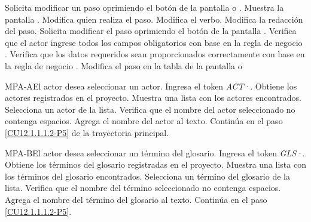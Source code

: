 	\begin{UCtrayectoria}
		\UCpaso[\UCactor] Solicita modificar un paso oprimiendo el botón \editar de la pantalla  o .
		\UCpaso[\UCsist] Muestra la pantalla .
		\UCpaso[\UCactor] Modifica quien realiza el paso. \label{CU12.1.1.1.2-P3}
		\UCpaso[\UCactor] Modifica el verbo.
		\UCpaso[\UCactor] Modifica la redacción del paso.            \label{CU12.1.1.1.2-P5}
		\UCpaso[\UCactor] Solicita modificar el paso oprimiendo el botón  de la pantalla .  
		\UCpaso[\UCsist] Verifica que el actor ingrese todos los campos obligatorios con base en la regla de negocio . 
		\UCpaso[\UCsist] Verifica que los datos requeridos sean proporcionados correctamente con base en la regla de negocio . 
		\UCpaso[\UCsist] Modifica el paso en la tabla de la pantalla  o 
	\end{UCtrayectoria}		
	
	\begin{UCtrayectoriaA}{MPA-A}{El actor desea seleccionar un actor.}
		\UCpaso[\UCactor] Ingresa el token {\em ACT·}.
		\UCpaso[\UCsist] Obtiene los actores registrados en el proyecto. 
		\UCpaso[\UCsist] Muestra una lista con los actores encontrados.
		\UCpaso[\UCactor] Selecciona un actor de la lista.
		\UCpaso[\UCsist] Verifica que el nombre del actor seleccionado no contenga espacios. 
		\UCpaso[\UCsist] Agrega el nombre del actor al texto.
		\UCpaso Continúa en el paso \ref{CU12.1.1.1.2-P5} de la trayectoria principal.
	\end{UCtrayectoriaA}

	\begin{UCtrayectoriaA}{MPA-B}{El actor desea seleccionar un término del glosario.}
		\UCpaso[\UCactor] Ingresa el token {\em GLS·}.
		\UCpaso[\UCsist] Obtiene los términos del glosario registradas en el proyecto. 
		\UCpaso[\UCsist] Muestra una lista con los términos del glosario encontrados.
		\UCpaso[\UCactor] Selecciona un término del glosario de la lista.
		\UCpaso[\UCsist] Verifica que el nombre del término seleccionado no contenga espacios. 
		\UCpaso[\UCsist] Agrega el nombre del término del glosario al texto.
		\UCpaso Continúa en el paso \ref{CU12.1.1.1.2-P5}.
	\end{UCtrayectoriaA}

